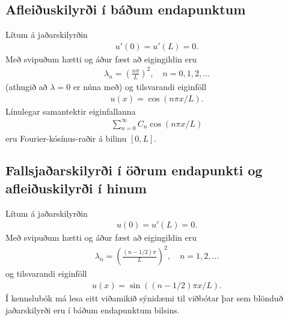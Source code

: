 \documentclass[a4paper,10pt,icelandic]{sphinxmanual}
\begin{document}
\subsection{Afleiðuskilyrði í báðum endapunktum}
\label{\detokenize{Kafli03:afleiuskilyri-i-baum-endapunktum}}
Lítum á jaðarskilyrðin
\begin{equation*}
\begin{split}u'(0) = u'(L) = 0.\end{split}
\end{equation*}
Með svipuðum hætti og áður fæst að eigingildin eru
\begin{equation*}
\begin{split}\lambda_n = \left(\frac{n\pi}{L}\right)^2, \quad n=0,1,2,\ldots\end{split}
\end{equation*}
(athugið að \(\lambda = 0\) er núna með) og tilsvarandi eiginföll
\begin{equation*}
\begin{split}u(x) = \cos(n\pi x/L).\end{split}
\end{equation*}
Línulegar samantektir eiginfallanna
\begin{equation*}
\begin{split}\sum_{n=0}^\infty C_n \cos(n\pi x/L)\end{split}
\end{equation*}
eru Fourier-kósínus-raðir á bilinu \([0,L]\).


\subsection{Fallsjaðarskilyrði í öðrum endapunkti og afleiðuskilyrði í hinum}
\label{\detokenize{Kafli03:fallsjaarskilyri-i-orum-endapunkti-og-afleiuskilyri-i-hinum}}
Lítum á jaðarskilyrðin
\begin{equation*}
\begin{split}u(0) = u'(L) = 0.\end{split}
\end{equation*}
Með svipuðum hætti og áður fæst að eigingildin eru
\begin{equation*}
\begin{split}\lambda_n = \left(\frac{(n-1/2)\pi}{L}\right)^2, \quad n=1,2,\ldots\end{split}
\end{equation*}
og tilsvarandi eiginföll
\begin{equation*}
\begin{split}u(x) = \sin((n-1/2)\pi x/L).\end{split}
\end{equation*}
Í kennslubók má lesa eitt viðamikið sýnidæmi til viðbótar þar sem blönduð jaðarskilyrði eru í báðum endapunktum bilsins.
\end{document}
